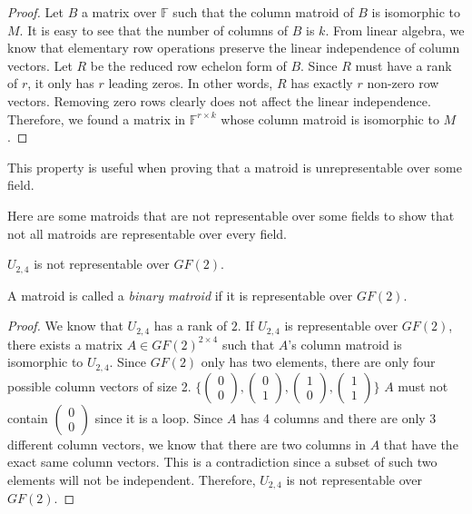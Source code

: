 \begin{proof}
Let $B$ a matrix over $\mathbb{F}$ such that the column matroid of $B$ is isomorphic to $M$.
It is easy to see that the number of columns of $B$ is $k$.
From linear algebra, we know that elementary row operations preserve the linear independence of column vectors.
Let $R$ be the reduced row echelon form of $B$.
Since $R$ must have a rank of $r$, it only has $r$ leading zeros.
In other words, $R$ has exactly $r$ non-zero row vectors.
Removing zero rows clearly does not affect the linear independence.
Therefore, we found a matrix in $\mathbb{F}^{r \times k}$ whose column matroid is isomorphic to $M$.
\end{proof}

This property is useful when proving that a matroid is unrepresentable over some field.

Here are some matroids that are not representable over some fields to show that not all matroids are representable over every field.

\begin{thm}
$U_{2, 4}$ is not representable over $GF(2)$.
\end{thm}

A matroid is called a \textit{binary matroid} if it is representable over $GF(2)$.

\begin{proof}
We know that $U_{2, 4}$ has a rank of $2$.
If $U_{2, 4}$ is representable over $GF(2)$, there exists a matrix $A \in GF(2)^{2 \times 4}$ such that $A$'s column matroid is isomorphic to $U_{2, 4}$.
Since $GF(2)$ only has two elements, there are only four possible column vectors of size 2.
$\bigg\{\begin{pmatrix}0\\0\end{pmatrix},
\begin{pmatrix}0\\1\end{pmatrix},
\begin{pmatrix}1\\0\end{pmatrix},
\begin{pmatrix}1\\1\end{pmatrix}\bigg\}$
$A$ must not contain $\begin{pmatrix}0\\0\end{pmatrix}$ since it is a loop. 
Since $A$ has 4 columns and there are only 3 different column vectors, we know that there are two columns in $A$ that have the exact same column vectors.
This is a contradiction since a subset of such two elements will not be independent.
Therefore, $U_{2, 4}$ is not representable over $GF(2)$.
\end{proof}

